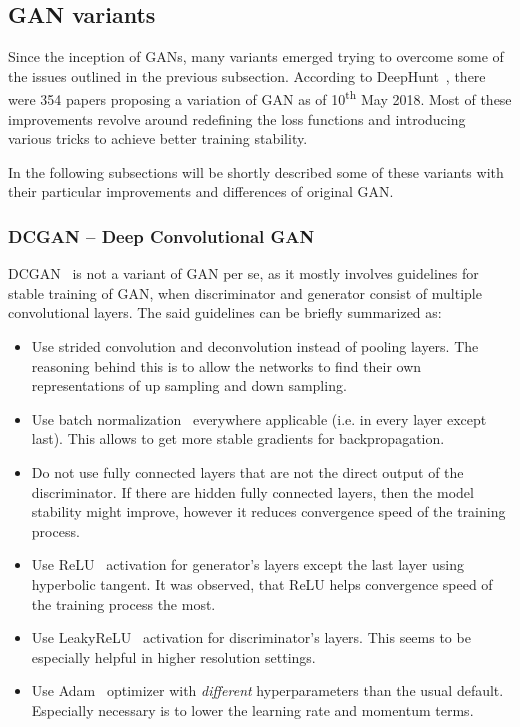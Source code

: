 \subsection{GAN variants}

Since the inception of GANs, many variants emerged trying to overcome some of the issues outlined in the previous subsection. According to DeepHunt~\cite{deephunt}, there were 354 papers proposing a variation of GAN as of 10\textsuperscript{th} May 2018. Most of these improvements revolve around redefining the loss functions and introducing various tricks to achieve better training stability.

In the following subsections will be shortly described some of these variants with their particular improvements and differences of original GAN.

\subsubsection{DCGAN -- Deep Convolutional GAN}
DCGAN~\cite{dcgan} is not a variant of GAN per se, as it mostly involves guidelines for stable training of GAN, when discriminator and generator consist of multiple convolutional layers. The said guidelines can be briefly summarized as:
\begin{itemize}
\item Use strided convolution and deconvolution instead of pooling layers. The reasoning behind this is to allow the networks to find their own representations of up sampling and down sampling.
\item Use batch normalization~\cite{batchnorm} everywhere applicable (i.e. in every layer except last). This allows to get more stable gradients for backpropagation.
\item Do not use fully connected layers that are not the direct output of the discriminator. If there are hidden fully connected layers, then the model stability might improve, however it reduces convergence speed of the training process.
\item Use ReLU~\cite{relu} activation for generator's layers except the last layer using hyperbolic tangent. It was observed, that ReLU helps convergence speed of the training process the most.
\item Use LeakyReLU~\cite{leakyrelu} activation for discriminator's layers. This seems to be especially helpful in higher resolution settings.
\item Use Adam~\cite{adam} optimizer with {\em different} hyperparameters than the usual default. Especially necessary is to lower the learning rate and momentum terms.
\end{itemize}

